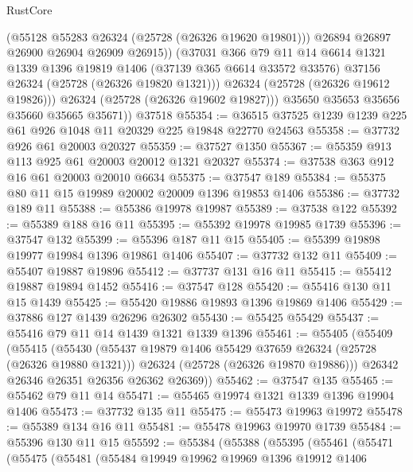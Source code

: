 \begin{lexlean}{RustCore}
\begin{coremodule}
                (@55128 @55283 @26324 (@25728 (@26326 @19620 @19801)))
                @26894
                @26897
                @26900
                @26904
                @26909
                @26915))
            (@37031
              @366
              @79
              @11
              @14
              @6614
              @1321
              @1339
              @1396
              @19819
              @1406
              (@37139 @365 @6614 @33572 @33576)
              @37156
              @26324
              (@25728 (@26326 @19820 @1321)))
            @26324
            (@25728 (@26326 @19612 @19826)))
          @26324
          (@25728 (@26326 @19602 @19827)))
        @35650
        @35653
        @35656
        @35660
        @35665
        @35671))
    @37518
@55354 := @36515 @37525 @1239 @1239 @225 @61 @926 @1048 @11 @20329 @225 @19848 @22770 @24563
@55358 := @37732 @926 @61 @20003 @20327
@55359 := @37527 @1350
@55367 := @55359 @913 @113 @925 @61 @20003 @20012 @1321 @20327
@55374 := @37538 @363 @912 @16 @61 @20003 @20010 @6634
@55375 := @37547 @189
@55384 := @55375 @80 @11 @15 @19989 @20002 @20009 @1396 @19853 @1406
@55386 := @37732 @189 @11
@55388 := @55386 @19978 @19987
@55389 := @37538 @122
@55392 := @55389 @188 @16 @11
@55395 := @55392 @19978 @19985 @1739
@55396 := @37547 @132
@55399 := @55396 @187 @11 @15
@55405 := @55399 @19898 @19977 @19984 @1396 @19861 @1406
@55407 := @37732 @132 @11
@55409 := @55407 @19887 @19896
@55412 := @37737 @131 @16 @11
@55415 := @55412 @19887 @19894 @1452
@55416 := @37547 @128
@55420 := @55416 @130 @11 @15 @1439
@55425 := @55420 @19886 @19893 @1396 @19869 @1406
@55429 := @37886 @127 @1439 @26296 @26302
@55430 := @55425 @55429
@55437 := @55416 @79 @11 @14 @1439 @1321 @1339 @1396
@55461 := @55405
    (@55409
      (@55415
        (@55430
          (@55437 @19879 @1406 @55429 @37659 @26324 (@25728 (@26326 @19880 @1321)))
          @26324
          (@25728 (@26326 @19870 @19886)))
        @26342
        @26346
        @26351
        @26356
        @26362
        @26369))
@55462 := @37547 @135
@55465 := @55462 @79 @11 @14
@55471 := @55465 @19974 @1321 @1339 @1396 @19904 @1406
@55473 := @37732 @135 @11
@55475 := @55473 @19963 @19972
@55478 := @55389 @134 @16 @11
@55481 := @55478 @19963 @19970 @1739
@55484 := @55396 @130 @11 @15
@55592 := @55384
    (@55388
      (@55395
        (@55461
          (@55471
            (@55475
              (@55481
                (@55484
                  @19949
                  @19962
                  @19969
                  @1396
                  @19912
                  @1406

\end{coremodule}
\end{lexlean}
